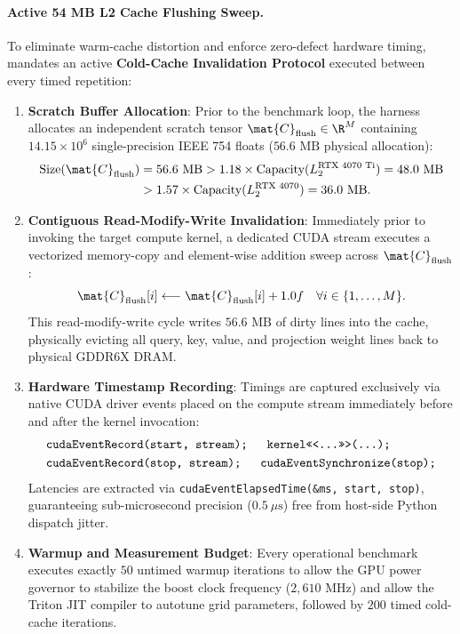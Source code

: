 \paragraph{Active 54 MB L2 Cache Flushing Sweep.} To eliminate warm-cache distortion and enforce zero-defect hardware timing, \neuralops{} mandates an active \textbf{Cold-Cache Invalidation Protocol} executed between every timed repetition:
\begin{enumerate}
    \item \textbf{Scratch Buffer Allocation}: Prior to the benchmark loop, the harness allocates an independent scratch tensor $\mat{C}_{\text{flush}} \in \R^{M}$ containing $14.15 \times 10^6$ single-precision IEEE 754 floats ($56.6\text{ MB}$ physical allocation):
    \begin{align}
    \label{eq:l2_flush_size}
    \text{Size}(\mat{C}_{\text{flush}}) &= 56.6\text{ MB} > 1.18 \times \text{Capacity}(L_2^{\text{RTX 4070 Ti}}) = 48.0\text{ MB} \nonumber \\
    &> 1.57 \times \text{Capacity}(L_2^{\text{RTX 4070}}) = 36.0\text{ MB}.
    \end{align}
    \item \textbf{Contiguous Read-Modify-Write Invalidation}: Immediately prior to invoking the target compute kernel, a dedicated CUDA stream executes a vectorized memory-copy and element-wise addition sweep across $\mat{C}_{\text{flush}}$:
    \begin{equation}
    \mat{C}_{\text{flush}}[i] \longleftarrow \mat{C}_{\text{flush}}[i] + 1.0f \quad \forall i \in \{1, \dots, M\}.
    \end{equation}
    This read-modify-write cycle writes $56.6\text{ MB}$ of dirty lines into the cache, physically evicting all query, key, value, and projection weight lines back to physical GDDR6X DRAM.
    \item \textbf{Hardware Timestamp Recording}: Timings are captured exclusively via native CUDA driver events placed on the compute stream immediately before and after the kernel invocation:
    \begin{equation}
    \begin{aligned}
    &\texttt{cudaEventRecord(start, stream); \quad kernel<<<...>>>(...);} \\
    &\texttt{cudaEventRecord(stop, stream); \quad cudaEventSynchronize(stop);}
    \end{aligned}
    \end{equation}
    Latencies are extracted via \texttt{cudaEventElapsedTime(\&ms, start, stop)}, guaranteeing sub-microsecond precision ($0.5\ \mu\text{s}$) free from host-side Python dispatch jitter.
    \item \textbf{Warmup and Measurement Budget}: Every operational benchmark executes exactly $50$ untimed warmup iterations to allow the GPU power governor to stabilize the boost clock frequency ($2{,}610\text{ MHz}$) and allow the Triton JIT compiler to autotune grid parameters, followed by $200$ timed cold-cache iterations.
\end{enumerate}

